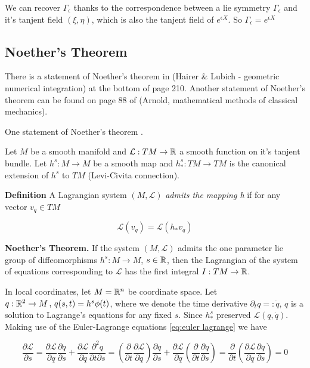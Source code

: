\documentclass[12pt]{article}
\begin{document}
We can recover $\Gamma_\epsilon$ thanks to the correspondence between a lie symmetry $\Gamma_\epsilon$ and it's tanjent field $(\xi,\eta)$, which is also the tanjent field of $e^{\epsilon X}$. So $\Gamma_\epsilon = e^{\epsilon X}$ 

\subsection{Noether's Theorem}

There is a statement of Noether's theorem in \cite{Numerical} (Hairer \& Lubich - geometric numerical integration) at the bottom of page 210. Another statement of Noether's theorem can be found on page 88 of \cite{Arnold} (Arnold, mathematical methods of classical mechanics). 

One statement of Noether's theorem \cite{Arnold}.

Let $M$ be a smooth manifold and $\mathcal L : TM\to \mathbb{R}$ a smooth function on it's tanjent bundle. Let $h^s : M\to M$ be a smooth map and $h^s_* : TM\to TM$ is the canonical extension of $h^s$ to $TM$ (Levi-Civita connection).

\textbf{Definition} A Lagrangian system $(M,\mathcal L)$ \textit{admits the mapping h} if for any vector $v_q\in TM$

$$\mathcal L(v_q) = \mathcal L(h_*v_q)$$

\textbf{Noether's Theorem.} If the system $(M,\mathcal L)$ admits the one parameter lie group of diffeomorphisms $h^s : M\to M$, $s\in \mathbb{R}$, then the Lagrangian of the system of equations corresponding to $\mathcal L$ has the first integral $I : TM\to \mathbb{R}$. 

In local coordinates, let $M = \mathbb{R}^n$ be coordinate space. Let $q : \mathbb{R}^2\to M\,,\,q(s,t) = h^s\phi(t)$, where we denote the time derivative $\partial_t q =: \dot q$, $q$ is a solution to Lagrange's equations for any fixed $s$. Since $h^s_*$ preserved $\mathcal L(q,\dot q)$. Making use of the Euler-Lagrange equations \eqref{eq:euler lagrange} we have 

\begin{equation}\label{eq:noether derivaiton}
\frac{\partial \mathcal L}{\partial s} = \frac{\partial \mathcal L}{\partial q}\frac{\partial q}{\partial s} + \frac{\partial \mathcal L}{\partial \dot q}\frac{\partial^2 q}{\partial t\partial s} = 
\left(\frac{\partial}{\partial t} \frac{\partial \mathcal L}{\partial \dot q}\right) \frac{\partial q}{\partial s} + \frac{\partial \mathcal L}{\partial \dot q}\left( \frac{\partial }{\partial t}\frac{\partial q}{\partial s} \right) 
= 
\frac{\partial}{\partial t}\left( \frac{\partial \mathcal L}{\partial \dot q}\frac{\partial q}{\partial s} \right) = 0
\end{equation}
\end{document}
